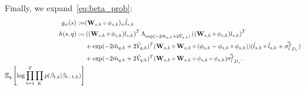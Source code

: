 \documentclass{article}
\newcommand{\mv}{\tilde{m}}
\newcommand{\vv}[0]{\tilde{V}}
\newcommand{\W}{\textbf{W}}
\newcommand{\lv}{\tilde{l}}
\newcommand{\vlv}{{\sigma^2_{l}}}
\newcommand{\tr}[0]{\mbox{Tr}}
\newcommand{\expectq}[1]{\mathbb{E}_q\left[#1\right]}
\begin{document}
Finally, we expand~\ref{eq:beta_prob}:
\begin{align}
 \label{eq:chain_elbo}
g_w(s) := & ( \W_{s,k} \circ \phi_{s,k} )_w \lv_{s,k} \\
h(s, q) := & \left( (\W_{s,k} \circ \phi_{s,k}) l_{s,k} \right)^T
       \Lambda_{\exp(-2 \mv_{q,k} + 2 \vv_{q,k})}
       \left( (\W_{s,k} \circ \phi_{s,k}) l_{s,k} \right)^T \notag \\
       & + \exp(-2 \mv_{q,k} + 2 \vv_{q,k})^T ( \W_{s,k} \circ \W_{s,k} \circ ( \phi_{s,k} - \phi_{s,k} \circ \phi_{s,k} ) ) (\lv_{s,k} \circ \lv_{s,k} + \vec{\vlv}_{D_{s}}) \notag \\
       & + \exp(-2 \mv_{q,k} + 2 \vv_{q,k})^T ( \W_{s,k} \circ \W_{s,k} \circ \phi_{s,k} \circ \phi_{s,k} ) \vec{\vlv}_{D_{s}}. \notag \\
 \expectq{ \log \prod_{t=1}^T \prod_K p(\beta_{t,k} |\beta_{t-1,k}) }

\end{align}
\end{document}
